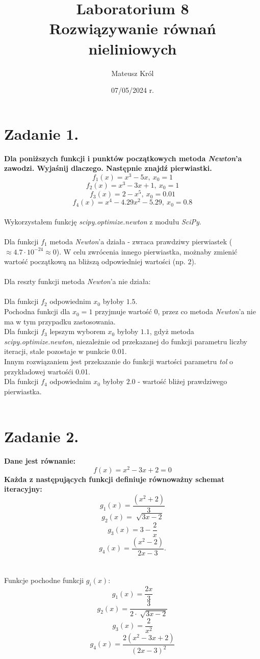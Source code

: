 \documentclass{article}
\title{%
Laboratorium 8\\
  \huge Rozwiązywanie równań nieliniowych}
\author{Mateusz Król}
\date{07/05/2024 r.}
\begin{document}
\maketitle

 
\section*{Zadanie 1.}
\textbf{Dla poniższych funkcji i punktów początkowych metoda 
\textit{Newton}'a
zawodzi. Wyjaśnij dlaczego. Następnie znajdź pierwiastki.
$$f_1(x) = x^3-5x,\ x_0=1$$
$$f_2(x) = x^3-3x+1,\ x_0=1$$
$$f_3(x) = 2-x^5,\ x_0=0.01$$
$$f_4(x) = x^4-4.29x^2-5.29,\ x_0=0.8$$} \\
\null\quad
Wykorzystałem funkcję \textit{scipy.optimize.newton} z modułu
\textit{SciPy}. \\\\
Dla funkcji $f_1$ metoda \textit{Newton}'a działa - zwraca prawdziwy
pierwiastek ($\approx 4.7 \cdot 10^{-24} \approx 0$). W celu zwrócenia
innego pierwiastka, możnaby zmienić wartość początkową na bliższą
odpowiedniej wartości (np. $2$). \\\\
Dla reszty funkcji metoda \textit{Newton}'a nie działa: \\\\
Dla funkcji $f_2$ odpowiednim $x_0$ byłoby $1.5$.\\
Pochodna funkcji dla $x_0=1$ przyjmuje wartość $0$,
przez co metoda \textit{Newton}'a nie ma w tym przypadku
zastosowania. \\
Dla funkcji $f_3$ lepszym wyborem $x_0$ byłoby $1.1$, gdyż metoda \textit{scipy.optimize.newton},
niezależnie od przekazanej do funkcji parametru liczby iteracji, stale pozostaje w punkcie 0.01. \\
Innym rozwiązaniem jest przekazanie do funkcji wartości parametru \textit{tol} o przykładowej
wartośći 0.01. \\
Dla funkcji $f_4$ odpowiednim $x_0$ byłoby $2.0$ - wartość bliżej 
prawdziwego pierwiastka. \\\\

\section*{Zadanie 2.}
\textbf{Dane jest równanie: $$f(x)=x^2-3x+2=0$$
Każda z następujących funkcji definiuje równoważny schemat iteracyjny:
$$g_1(x)=\frac{(x^2+2)}{3}$$
$$g_2(x)=\sqrt[]{3x-2}$$
$$g_3(x)=3-\frac{2}{x}$$
$$g_4(x)=\frac{(x^2-2)}{2x-3}.$$
}
\\\\
\null\quad Funkcje pochodne funkcji $g_i(x)$:
$$g_1(x)=\frac{2x}{3}$$
$$g_2(x)=\frac{3}{2\cdot \sqrt[]{3x-2}}$$
$$g_3(x)=\frac{2}{x^2}$$
$$g_4(x)=\frac{2(x^2-3x+2)}{(2x-3)^2}$$
\end{document}
